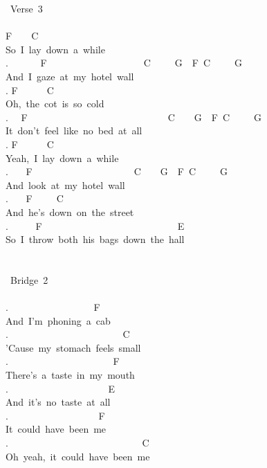 {\lbrack\ Verse\ 3\rbrack\\
\\
F\ \ \ \ C\\
So\ I\ lay\ down\ a\ while\\
. \ \ \ \ \ \ F\ \ \ \ \ \ \ \ \ \ \ \ \ \ \ \ \ \ \ \ C\ \ \ \ \ G\ \ F\ C\ \ \ \ \ G\\
And\ I\ gaze\ at\ my\ hotel\ wall\\
. F\ \ \ \ \ \ C\\
Oh,\ the\ cot\ is\ so\ cold\\
. \ \ F\ \ \ \ \ \ \ \ \ \ \ \ \ \ \ \ \ \ \ \ \ \ \ \ \ \ \ \ \ C\ \ \ \ G\ \ F\ C\ \ \ \ \ G\\
It\ don't\ feel\ like\ no\ bed\ at\ all\\
. F\ \ \ \ \ \ C\\
Yeah,\ I\ lay\ down\ a\ while\\
. \ \ \ F\ \ \ \ \ \ \ \ \ \ \ \ \ \ \ \ \ \ \ \ \ C\ \ \ \ G\ \ F\ C\ \ \ \ \ G\\
And\ look\ at\ my\ hotel\ wall\\
. \ \ \ F\ \ \ \ \ C\\
And\ he's\ down\ on\ the\ street\\
. \ \ \ \ \ F\ \ \ \ \ \ \ \ \ \ \ \ \ \ \ \ \ \ \ \ \ \ \ \ \ \ \ \ E\\
So\ I\ throw\ both\ his\ bags\ down\ the\ hall\\
\\
\\
\lbrack\ Bridge\ 2\rbrack\\
\\
. \ \ \ \ \ \ \ \ \ \ \ \ \ \ \ \ \ F\\
And\ I'm\ phoning\ a\ cab\\
. \ \ \ \ \ \ \ \ \ \ \ \ \ \ \ \ \ \ \ \ \ \ \ C\\
'Cause\ my\ stomach\ feels\ small\\
. \ \ \ \ \ \ \ \ \ \ \ \ \ \ \ \ \ \ \ \ \ F\\
There's\ a\ taste\ in\ my\ mouth\\
. \ \ \ \ \ \ \ \ \ \ \ \ \ \ \ \ \ \ \ \ E\\
And\ it's\ no\ taste\ at\ all\\
. \ \ \ \ \ \ \ \ \ \ \ \ \ \ \ \ \ \ F\\
It\ could\ have\ been\ me\\
. \ \ \ \ \ \ \ \ \ \ \ \ \ \ \ \ \ \ \ \ \ \ \ \ \ \ \ C\\
Oh\ yeah,\ it\ could\ have\ been\ me\\
}
